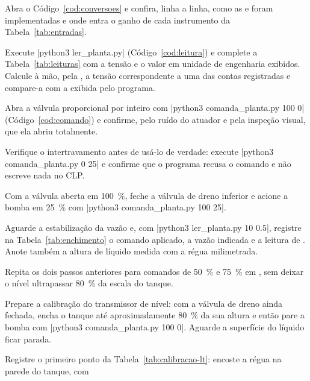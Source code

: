 \begin{roteiro}
  \item Abra o Código~\ref{cod:conversoes} e confira, linha a linha, como as  e  foram
    implementadas e onde entra o ganho de cada instrumento da Tabela~\ref{tab:entradas}.
  \item Execute \cd|python3 ler_planta.py| (Código~\ref{cod:leitura}) e complete a
    Tabela~\ref{tab:leituras} com a tensão e o valor em unidade de engenharia exibidos. Calcule à mão, pela
    , a tensão correspondente a uma das contas registradas e compare-a com a exibida pelo
    programa.
  \item Abra a válvula proporcional  por inteiro com
    \cd|python3 comanda_planta.py 100 0| (Código~\ref{cod:comando}) e confirme, pelo ruído do
    atuador e pela inspeção visual, que ela abriu totalmente.
  \item Verifique o intertravamento antes de usá-lo de verdade: execute
    \cd|python3 comanda_planta.py 0 25| e confirme que o programa recusa o comando e não escreve
    nada no CLP.
  \item Com a válvula  aberta em \qty{100}{\percent}, feche a válvula de dreno inferior e acione a bomba
    em \qty{25}{\percent} com \cd|python3 comanda_planta.py 100 25|.
  \item Aguarde a estabilização da vazão e, com \cd|python3 ler_planta.py 10 0.5|, registre na
    Tabela~\ref{tab:enchimento} o comando aplicado, a vazão  indicada e a leitura de . Anote
    também a altura de líquido medida com a régua milimetrada.
  \item Repita os dois passos anteriores para comandos de \qty{50}{\percent} e \qty{75}{\percent} em
    , sem deixar o nível ultrapassar \qty{80}{\percent} da escala do tanque.
  \item Prepare a calibração do transmissor de nível: com a válvula de dreno ainda fechada, encha o tanque
    até aproximadamente \qty{80}{\percent} da sua altura e então pare a bomba com
    \cd|python3 comanda_planta.py 100 0|. Aguarde a superfície do líquido ficar parada.
  \item Registre o primeiro ponto da Tabela~\ref{tab:calibracao-lt}: encoste a régua na parede do tanque, com

\end{roteiro}

